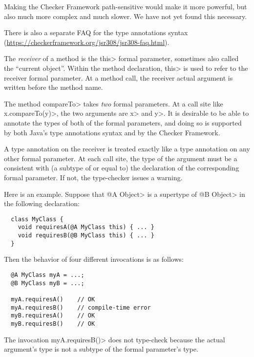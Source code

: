 Making the Checker Framework path-sensitive would make it more powerful,
but also much more complex and much slower.  We have not yet found this
necessary.



There is also a separate FAQ for the type annotations syntax
(\url{https://checkerframework.org/jsr308/jsr308-faq.html}).



The \emph{receiver} of a method is the \<this> formal parameter, sometimes
also called the ``current object''.  Within the method declaration, \<this>
is used to refer to the receiver formal parameter.  At a method call, the
receiver actual argument is written before the method name.

The method \<compareTo> takes \emph{two} formal parameters.  At a call site
like \<x.compareTo(y)>, the two arguments are \<x> and \<y>.  It is
desirable to be able to annotate the types of both of the formal
parameters, and doing so is supported by both Java's type annotations
syntax and by the Checker Framework.

A type annotation on the receiver is treated exactly like a type annotation
on any other formal parameter.  At each call site, the type of the argument
must be a consistent with (a subtype of or equal to) the declaration of the
corresponding formal parameter.  If not, the type-checker issues a warning.

Here is an example.  Suppose that \<@A Object> is a supertype of \<@B
Object> in the following declaration:

\begin{Verbatim}
  class MyClass {
    void requiresA(@A MyClass this) { ... }
    void requiresB(@B MyClass this) { ... }
  }
\end{Verbatim}

\noindent
Then the behavior of four different invocations is as follows:

\begin{Verbatim}
  @A MyClass myA = ...;
  @B MyClass myB = ...;

  myA.requiresA()    // OK
  myA.requiresB()    // compile-time error
  myB.requiresA()    // OK
  myB.requiresB()    // OK
\end{Verbatim}

The invocation \<myA.requiresB()> does not type-check because the actual
argument's type is not a subtype of the formal parameter's type.

